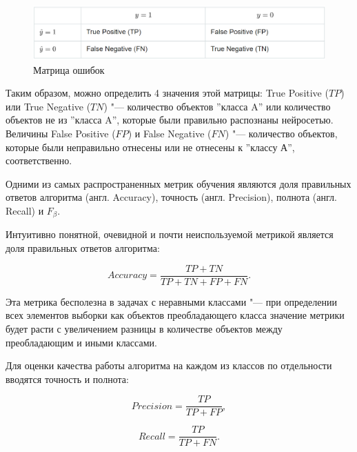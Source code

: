 \documentclass[bachelor, och, coursework]{SCWorks}
\begin{document}
        \begin{figure}[H]
            \centering
            \includegraphics[width=1\textwidth]{pic/matrix.png}
            \caption{Матрица ошибок}
        \end{figure}

        Таким образом, можно определить 4 значения этой матрицы: True Positive
        ($TP$) или True Negative ($TN$) "--- количество объектов ''класса A''
        или количество объектов не из ''класса A'', которые были правильно
        распознаны нейросетью. Величины False Positive ($FP$) и False Negative
        ($FN$) "--- количество объектов, которые были неправильно отнесены или
        не отнесены к ''классу А'', соответственно.

        Одними из самых распространенных метрик обучения являются доля
        правильных ответов алгоритма (англ. Accuracy), точность (англ.
        Precision), полнота (англ. Recall) и $F_\beta$. \cite{scores}

        Интуитивно понятной, очевидной и почти неиспользуемой метрикой является
        доля правильных ответов алгоритма:

        \begin{equation}
            Accuracy = \frac{TP + TN}{TP + TN + FP + FN}.
        \end{equation}

        Эта метрика бесполезна в задачах с неравными классами "--- при
        определении всех элементов выборки как объектов преобладающего класса
        значение метрики будет расти с увеличением разницы в количестве объектов
        между преобладающим и иными классами.

        Для оценки качества работы алгоритма на каждом из классов по отдельности
        вводятся точность и полнота:

        \begin{equation}
            Precision = \frac{TP}{TP + FP},
        \end{equation}

        \begin{equation}
            Recall = \frac{TP}{TP + FN}.
        \end{equation}
\end{document}
